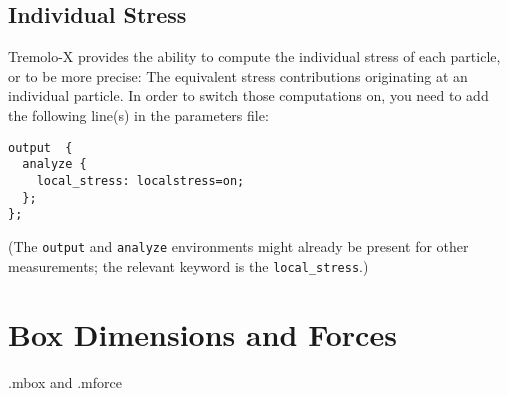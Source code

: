 \subsection{Individual Stress}
Tremolo-X provides the ability to compute the individual stress of each particle, or to be more precise: The equivalent stress contributions originating at an
individual particle. In order to switch those computations on, you need to add the following line(s) in the parameters file:
\begin{lstlisting}
output  {
  analyze {
    local_stress: localstress=on;
  };
};
\end{lstlisting}
(The {\tt output} and {\tt analyze} environments might already be present for other measurements; the relevant keyword is the {\tt local\_stress}.)


\section{Box Dimensions and Forces}
.mbox and .mforce
